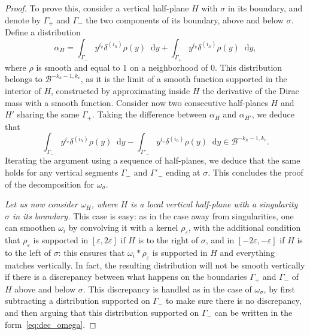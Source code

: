 \documentclass[JEP,XML,SOM,Unicode]{cedram}
\newcommand{\boB}{\mathcal{B}}
\newcommand{\dd}{\mathop{}\!\mathrm{d}}
\let\epsilon\varepsilon
\theoremstyle{definition}
\numberwithin{equation}{section}
\begin{document}
\begin{proof}
To prove this, consider a vertical half-plane $H$ with $\sigma$ in its
boundary, and denote by $\Gamma_+$ and $\Gamma_-$ the two components of its
boundary, above and below $\sigma$. Define a distribution
\[
\alpha_H =
\int_{\Gamma_-} y^{i_v} \delta^{(i_h)} \rho(y) \dd y + \int_{\Gamma_+}
y^{i_v} \delta^{(i_h)} \rho(y) \dd y,
\]
where $\rho$ is smooth and equal to $1$
on a neighborhood of $0$. This distribution belongs to $\boB^{-k_h-1, k_v}$,
as it is the limit of a smooth function supported in the interior of $H$,
constructed by approximating inside $H$ the derivative of the Dirac mass with
a smooth function. Consider now two consecutive half-planes $H$ and $H'$
sharing the same $\Gamma_+$. Taking the difference between $\alpha_H$ and
$\alpha_{H'}$, we deduce that
\begin{equation*}
\int_{\Gamma_-} y^{i_v} \delta^{(i_h)} \rho(y) \dd y
- \int_{\Gamma'_-} y^{i_v} \delta^{(i_h)} \rho(y) \dd y
\in \boB^{-k_h-1, k_v}.
\end{equation*}
Iterating the argument using a sequence of half-planes, we deduce that the
same holds for any vertical segments $\Gamma_-$ and $\Gamma'_-$ ending at
$\sigma$. This concludes the proof of the decomposition for $\omega_\sigma$.

\emph{Let us now consider $\omega_H$, where $H$ is a local vertical half-plane
with a singularity~$\sigma$ in its boundary.} This case is easy: as in the
case away from singularities, one can smoothen $\omega_i$ by convolving it
with a kernel $\rho_\epsilon$, with the additional condition that
$\rho_\epsilon$ is supported in $[\epsilon,2\epsilon]$ if $H$ is to the right
of $\sigma$, and in $[-2\epsilon, -\epsilon]$ if $H$ is to the left of
$\sigma$: this ensures that $\omega_i * \rho_\epsilon$ is supported in $H$
and everything matches vertically. In fact, the resulting distribution will
not be smooth vertically if there is a discrepancy between what happens on
the boundaries $\Gamma_+$ and $\Gamma_-$ of $H$ above and below $\sigma$.
This discrepancy is handled as in the case of $\omega_\sigma$, by first
subtracting a distribution supported on $\Gamma_-$ to make sure there is no
discrepancy, and then arguing that this distribution supported on $\Gamma_-$
can be written in the form~\eqref{eq:dec_omega}.


\end{proof}
\end{document}
